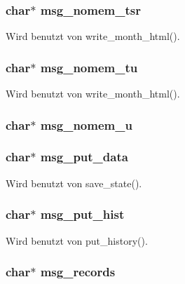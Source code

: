 \subsubsection{\setlength{\rightskip}{0pt plus 5cm}char$\ast$ {\bf msg\_\-nomem\_\-tsr}}\label{lang_8h_8fa82c2055a9fa9ee57d49129758cf14}




Wird benutzt von write\_\-month\_\-html().
\subsubsection{\setlength{\rightskip}{0pt plus 5cm}char$\ast$ {\bf msg\_\-nomem\_\-tu}}\label{lang_8h_0818c9fe28426f27e863c5d1d6971be7}




Wird benutzt von write\_\-month\_\-html().
\subsubsection{\setlength{\rightskip}{0pt plus 5cm}char$\ast$ {\bf msg\_\-nomem\_\-u}}\label{lang_8h_4f94ee12bccb4680d59196515afb79fc}


\subsubsection{\setlength{\rightskip}{0pt plus 5cm}char$\ast$ {\bf msg\_\-put\_\-data}}\label{lang_8h_b9771714bf044067d9c69fe0e7490bb4}




Wird benutzt von save\_\-state().
\subsubsection{\setlength{\rightskip}{0pt plus 5cm}char$\ast$ {\bf msg\_\-put\_\-hist}}\label{lang_8h_72324582cd40a329d7d29f6a2ca9738e}




Wird benutzt von put\_\-history().
\subsubsection{\setlength{\rightskip}{0pt plus 5cm}char$\ast$ {\bf msg\_\-records}}\label{lang_8h_88e6df607f1a60fa253d40f651b00379}


